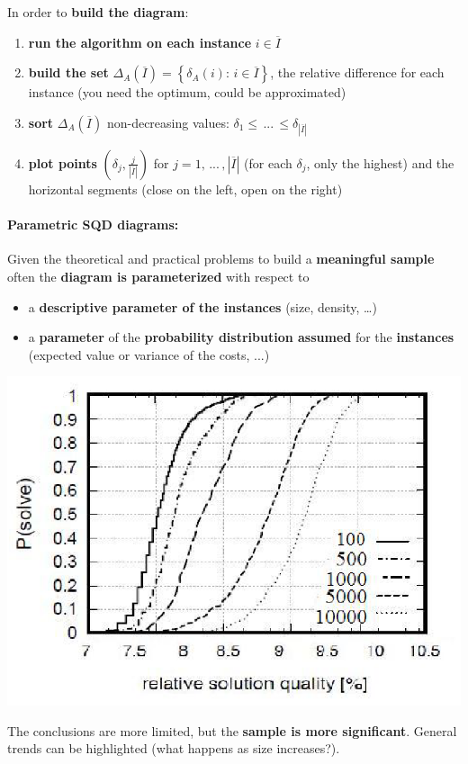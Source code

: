 In order to \textbf{build the diagram}:
\begin{enumerate}
	\item \textbf{run the algorithm on each instance} $i \in \overline{I}$
	\item \textbf{build the set} $\Delta_A (\overline{I}) = \left\{\delta_A (i): \, i \in \overline{I} \right\}$, the relative difference for each instance (you need the optimum, could be approximated)
	\item \textbf{sort} $\Delta_A (\overline{I})$ non-decreasing values: $\delta_1 \leq \, ... \, \leq \delta_{|\overline{I}|}$
	\item \textbf{plot points} $\left(\delta_j, \frac{j}{|\overline{I}|}\right)$ for $j = 1, \, ... \, , |\overline{I}|$ (for each $\delta_j$, only the highest) and the horizontal segments (close on the left, open on the right)
\end{enumerate}

\newpage

\paragraph{Parametric SQD diagrams:} Given the theoretical and practical problems to build a \textbf{meaningful sample} often the \textbf{diagram is parameterized} with respect to
\begin{itemize}
	\item a \textbf{descriptive parameter of the instances} (size, density, \dots)
	\item a \textbf{parameter} of the \textbf{probability distribution assumed} for the \textbf{instances} (expected value or variance of the costs, ...)
\end{itemize}
\begin{center}
	\includegraphics[width=0.7\columnwidth]{img/SQD3}
\end{center}
The conclusions are more limited, but the \textbf{sample is more significant}. General trends can be highlighted (what happens as size increases?).\\

